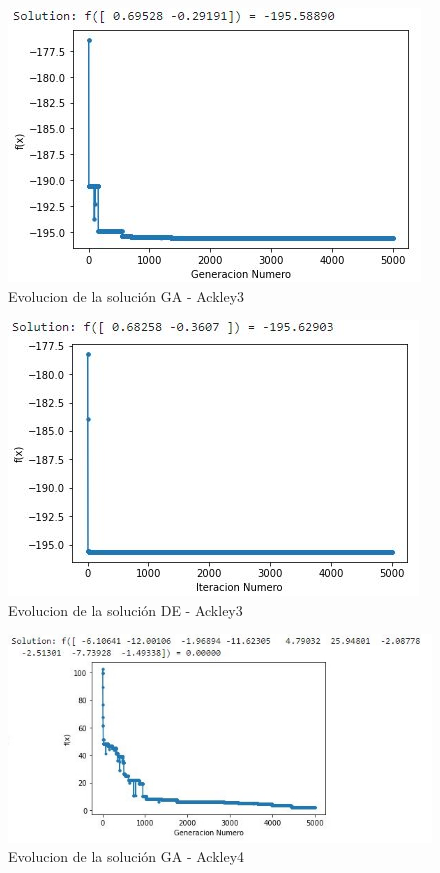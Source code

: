 \documentclass[10pt]{article}
\begin{document}
\begin{figure}[H]
\centerline{\includegraphics{ack-3-ga.jpg}}
\caption{Evolucion de la solución GA - Ackley3}
\label{fig_5}
\end{figure}

\begin{figure}[H]
\centerline{\includegraphics{ack-3-de.jpg}}
\caption{Evolucion de la solución DE - Ackley3}
\label{fig_6}
\end{figure}

\begin{figure}[H]
\centerline{\includegraphics{ack-4-ga.jpg}}
\caption{Evolucion de la solución GA - Ackley4}
\label{fig_7}
\end{figure}
\end{document}
